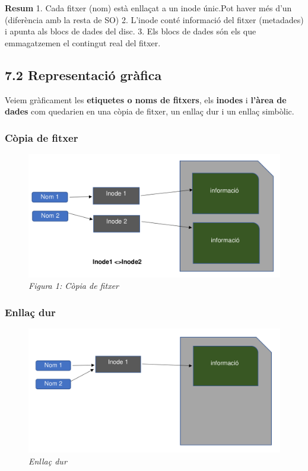 \documentclass[
  12 pt,
  a4paper,
]{article}
\begin{document}
\textbf{Resum} 1. Cada fitxer (nom) està enllaçat a un inode únic.Pot
haver més d'un (diferència amb la resta de SO) 2. L'inode conté
informació del fitxer (metadades) i apunta als blocs de dades del disc.
3. Els blocs de dades són els que emmagatzemen el contingut real del
fitxer.

\subsection{7.2 Representació
gràfica}\label{representaciuxf3-gruxe0fica}

Veiem gràficament les \textbf{etiquetes o noms de fitxers}, els
\textbf{inodes} i \textbf{l'àrea de dades} com quedarien en una còpia de
fitxer, un enllaç dur i un enllaç simbòlic.

\subsubsection{Còpia de fitxer}\label{cuxf2pia-de-fitxer}

\begin{figure}
\centering
\includegraphics{png/copiadeFitxer.png}
\caption{\emph{Figura 1: Còpia de fitxer}}
\end{figure}

\subsubsection{Enllaç dur}\label{enllauxe7-dur}

\begin{figure}
\centering
\includegraphics{png/enllaçDur.png}
\caption{\emph{Enllaç dur}}
\end{figure}
\end{document}
